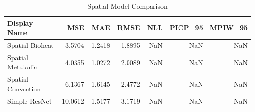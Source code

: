 \begin{table}
\caption{Spatial Model Comparison}
\begin{tabular}{lrrrrrr}
\toprule
Display Name & MSE & MAE & RMSE & NLL & PICP_95 & MPIW_95 \\
\midrule
Spatial Bioheat & 3.5704 & 1.2418 & 1.8895 & NaN & NaN & NaN \\
Spatial Metabolic & 4.0355 & 1.0272 & 2.0089 & NaN & NaN & NaN \\
Spatial Convection & 6.1367 & 1.6145 & 2.4772 & NaN & NaN & NaN \\
Simple ResNet & 10.0612 & 1.5177 & 3.1719 & NaN & NaN & NaN \\
\bottomrule
\end{tabular}
\end{table}
